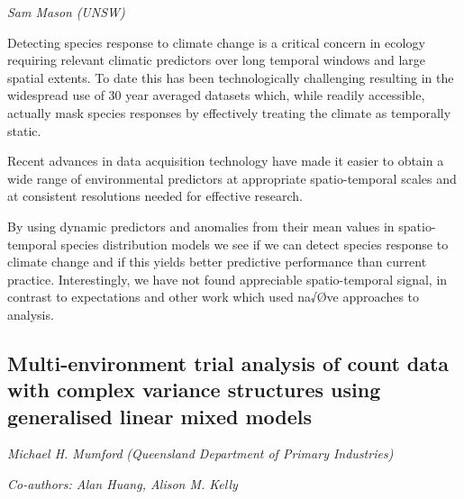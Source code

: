 \documentclass[
]{scrreprt}
\begin{document}
\emph{Sam Mason} \emph{(UNSW)}

\setlength{\parskip}{0.5em}

Detecting species response to climate change is a critical concern in
ecology requiring relevant climatic predictors over long temporal
windows and large spatial extents. To date this has been technologically
challenging resulting in the widespread use of 30 year averaged datasets
which, while readily accessible, actually mask species responses by
effectively treating the climate as temporally static.

Recent advances in data acquisition technology have made it easier to
obtain a wide range of environmental predictors at appropriate
spatio-temporal scales and at consistent resolutions needed for
effective research.

By using dynamic predictors and anomalies from their mean values in
spatio-temporal species distribution models we see if we can detect
species response to climate change and if this yields better predictive
performance than current practice. Interestingly, we have not found
appreciable spatio-temporal signal, in contrast to expectations and
other work which used na√Øve approaches to analysis.

\subsection{Multi-environment trial analysis of count data with complex
variance structures using generalised linear mixed
models}\label{multi-environment-trial-analysis-of-count-data-with-complex-variance-structures-using-generalised-linear-mixed-models}

\emph{Michael H. Mumford} \emph{(Queensland
Department of Primary Industries)}

\emph{Co-authors: Alan Huang, Alison M. Kelly}

\setlength{\parskip}{0.5em}
\end{document}
